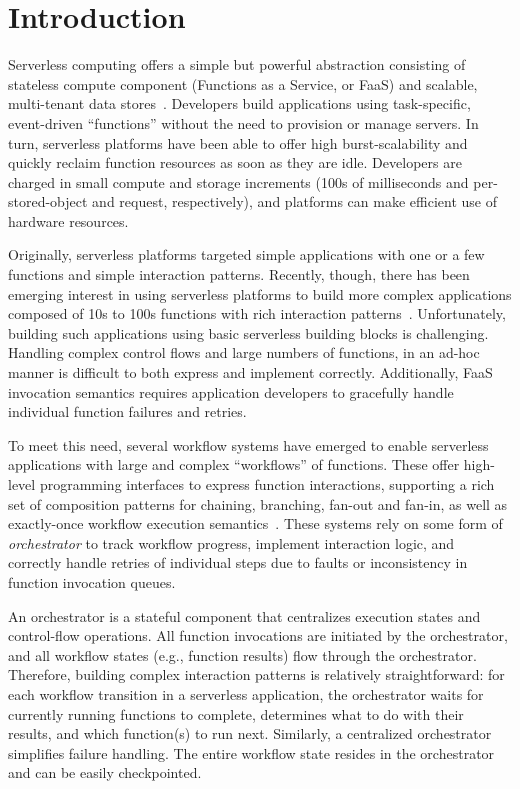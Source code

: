 \section{Introduction}

Serverless computing offers a simple but powerful abstraction consisting of
stateless compute component (Functions as a Service, or FaaS) and scalable,
multi-tenant data stores~\cite{berkeley}. Developers build applications using
task-specific, event-driven ``functions'' without the need to provision or
manage servers. In turn, serverless platforms have been able to offer high
burst-scalability and quickly reclaim function resources as soon as they are
idle. Developers are charged in small compute and storage increments (100s of
milliseconds and per-stored-object and request, respectively), and platforms
can make efficient use of hardware resources.

Originally, serverless platforms targeted simple applications with one or a few
functions and simple interaction patterns. Recently, though, there has been
emerging interest in using serverless platforms to build more complex
applications composed of 10s to 100s functions with rich interaction
patterns~\cite{excamera, pywren, gg-atc, beldi, boki}. Unfortunately, building
such applications using basic serverless building blocks is challenging.
Handling complex control flows and large numbers of functions, in an ad-hoc
manner is difficult to both express and implement correctly. Additionally, FaaS
invocation semantics requires application developers to gracefully handle
individual function failures and retries.

To meet this need, several workflow systems have emerged to enable serverless
applications with large and complex ``workflows'' of functions. These offer
high-level programming interfaces to express function interactions, supporting a
rich set of composition patterns for chaining, branching, fan-out and fan-in, as
well as exactly-once workflow execution semantics~\cite{excamera, gg-atc,
aws-step-functions, google-cloud-composer, google-workflows, durable-functions}.
These systems rely on some form of \emph{orchestrator} to track workflow
progress, implement interaction logic, and correctly handle retries of
individual steps due to faults or inconsistency in function invocation queues.

An orchestrator is a stateful component that centralizes execution states and
control-flow operations. All function invocations are initiated by the
orchestrator, and all workflow states (e.g., function results) flow through the
orchestrator. Therefore, building complex interaction patterns is relatively
straightforward: for each workflow transition in a serverless application, the
orchestrator waits for currently running functions to complete, determines what
to do with their results, and which function(s) to run next. Similarly, a
centralized orchestrator simplifies failure handling. The entire workflow state
resides in the orchestrator and can be easily checkpointed.

